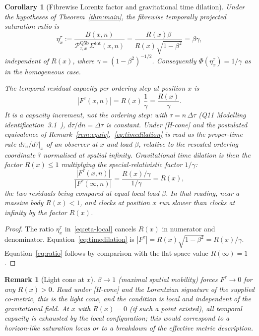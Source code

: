 \documentclass[11pt,a4paper]{article}
\newtheorem{corollary}[theorem]{Corollary}
\newtheorem{remark}[theorem]{Remark}
\begin{document}
  \begin{corollary}[Fibrewise Lorentz factor and gravitational time dilation]\label{cor:timedil}
    Under the hypotheses of Theorem~\ref{thm:main}, the fibrewise temporally projected
    saturation ratio is
    \begin{equation}\label{eq:eta-local}
      \eta_x^\tau := \frac{B(x,n)}{\mathcal{P}_{\tau,x}^{\mathrm{Q5b}}\Sigma^{\mathrm{tot}}(x,n)}
      = \frac{R(x)\beta}{ R(x)\sqrt{1-\beta^2}} = \beta\gamma,
    \end{equation}
    independent of $R(x)$, where $\gamma = (1-\beta^2)^{-1/2}$.
    Consequently $\Phi(\eta_x^\tau) = 1/\gamma$ as in the homogeneous case.

    The temporal residual capacity per ordering step at position $x$ is
    \begin{equation}\label{eq:timedilation}
      |F^\tau(x,n)| = R(x)\,\frac{1}{\gamma}
      = \frac{R(x)}{\gamma}.
    \end{equation}
    It is a capacity increment, not the ordering step: with $\tau = n\,\Delta\tau$ (Q11 Modelling
    identification~3.1~\cite{Beau2026q11}), $d\tau/dn = \Delta\tau$ is constant.
    Under [H-cone] and the postulated equivalence of Remark~\ref{rem:equiv},~\eqref{eq:timedilation} is read as
    the proper-time rate $d\tau_u/d\hat\tau|_x$ of an observer at $x$ and load $\beta$, relative to the rescaled
    ordering coordinate $\hat\tau$ normalised at spatial infinity.
    Gravitational time dilation is then the factor $R(x) \leq 1$ multiplying the special-relativistic
    factor $1/\gamma$:
    \begin{equation}\label{eq:ratio}
      \frac{|F^\tau(x,n)|}{|F^\tau(\infty,n)|}
      = \frac{R(x)/\gamma}{1/\gamma} = R(x),
    \end{equation}
    the two residuals being compared at equal local load $\beta$.
    In that reading, near a massive body $R(x) < 1$, and clocks at position $x$ run slower than clocks at
    infinity by the factor $R(x)$.
  \end{corollary}

  \begin{proof}
    The ratio $\eta_x^\tau$ in~\eqref{eq:eta-local} cancels $R(x)$ in numerator and
    denominator.
    Equation~\eqref{eq:timedilation} is $|F^\tau| = R(x)\sqrt{1-\beta^2} = R(x)/\gamma$.
    Equation~\eqref{eq:ratio} follows by comparison with the flat-space value $R(\infty) = 1$.
  \end{proof}

  \begin{remark}[Light cone at $x$]\label{rem:lightcone}
    $\beta \to 1$ (maximal spatial mobility) forces $F^\tau \to 0$ for any $R(x) > 0$.
    Read under [H-cone] and the Lorentzian signature of the supplied co-metric, this is the light cone, and the
    condition is local and independent of the gravitational field.
    At $x$ with $R(x) = 0$ (if such a point existed), all temporal capacity is exhausted
    by the local configuration; this would correspond to a horizon-like saturation locus
    or to a breakdown of the effective metric description.
  \end{remark}
\end{document}

